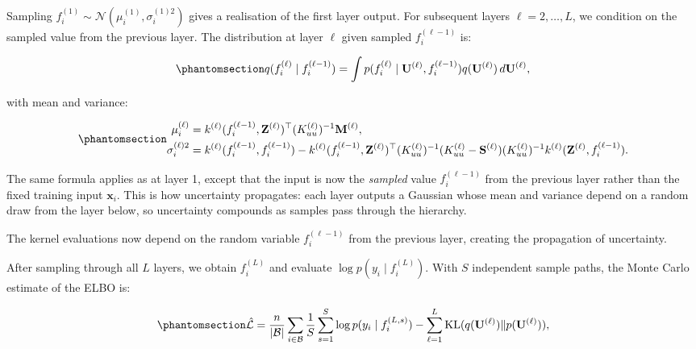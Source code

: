 \documentclass[
  letterpaper,
  DIV=11,
  numbers=noendperiod]{scrartcl}
\begin{document}
Sampling \(f_i^{(1)} \sim \mathcal{N}(\mu_i^{(1)}, \sigma_i^{(1)2})\)
gives a realisation of the first layer output. For subsequent layers
\(\ell = 2, \ldots, L\), we condition on the sampled value from the
previous layer. The distribution at layer \(\ell\) given sampled
\(f_i^{(\ell-1)}\) is:

\begin{equation}\phantomsection\label{eq-layer_conditional}{
q(f_i^{(\ell)} \mid f_i^{(\ell-1)}) = \int p(f_i^{(\ell)} \mid \mathbf{U}^{(\ell)}, f_i^{(\ell-1)}) q(\mathbf{U}^{(\ell)}) \, d\mathbf{U}^{(\ell)},
}\end{equation}

with mean and variance:

\begin{equation}\phantomsection\label{eq-layer_ell_moments}{
\begin{aligned}
\mu_i^{(\ell)} &= k^{(\ell)}(f_i^{(\ell-1)}, \mathbf{Z}^{(\ell)})^\top (K_{uu}^{(\ell)})^{-1} \mathbf{M}^{(\ell)}, \\
\sigma_i^{(\ell)2} &= k^{(\ell)}(f_i^{(\ell-1)}, f_i^{(\ell-1)}) - k^{(\ell)}(f_i^{(\ell-1)}, \mathbf{Z}^{(\ell)})^\top (K_{uu}^{(\ell)})^{-1} (K_{uu}^{(\ell)} - \mathbf{S}^{(\ell)}) (K_{uu}^{(\ell)})^{-1} k^{(\ell)}(\mathbf{Z}^{(\ell)}, f_i^{(\ell-1)}).
\end{aligned}
}\end{equation}

The same formula applies as at layer 1, except that the input is now the
\emph{sampled} value \(f_i^{(\ell-1)}\) from the previous layer rather
than the fixed training input \(\mathbf{x}_i\). This is how uncertainty
propagates: each layer outputs a Gaussian whose mean and variance depend
on a random draw from the layer below, so uncertainty compounds as
samples pass through the hierarchy.

The kernel evaluations now depend on the random variable
\(f_i^{(\ell-1)}\) from the previous layer, creating the propagation of
uncertainty.

After sampling through all \(L\) layers, we obtain \(f_i^{(L)}\) and
evaluate \(\log p(y_i \mid f_i^{(L)})\). With \(S\) independent sample
paths, the Monte Carlo estimate of the ELBO is:

\begin{equation}\phantomsection\label{eq-dsvi_mc_elbo}{
\hat{\mathcal{L}} = \frac{n}{|\mathcal{B}|} \sum_{i \in \mathcal{B}} \frac{1}{S} \sum_{s=1}^{S} \log p(y_i \mid f_i^{(L,s)}) - \sum_{\ell=1}^{L} \operatorname{KL}(q(\mathbf{U}^{(\ell)}) \| p(\mathbf{U}^{(\ell)})),
}\end{equation}
\end{document}
